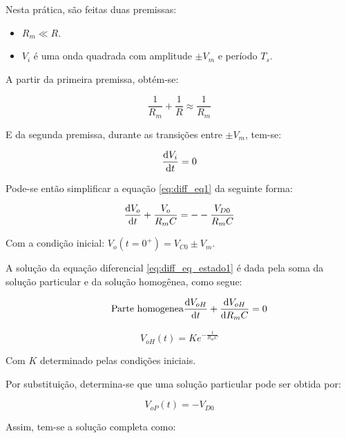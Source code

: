Nesta prática, são feitas duas premissas:

\begin{itemize}
    \item $R_m \ll R$. \\
    \item  $V_i$ é uma onda quadrada com amplitude $\pm V_m$ e período $T_s$.
\end{itemize}

A partir da primeira premissa, obtém-se:

\begin{equation}
    \frac{1}{R_m} + \frac{1}{R} \approx \frac{1}{R_m}
\end{equation}

E da segunda premissa, durante as transições entre $\pm V_m$, tem-se:

\begin{equation}
    \frac{\mathrm d V_i}{\mathrm d t} = 0
\end{equation}

Pode-se então simplificar a equação \ref{eq:diff_eq1} da seguinte forma:

\begin{equation}
    \label{eq:diff_eq_estado1}
    \frac{\mathrm d V_o}{\mathrm d t} + \frac{V_o}{R_m C}= - -\frac{V_{D0}}{R_m C}
\end{equation}

Com a condição inicial: $V_o(t = 0^{+}) = V_{C0} \pm V_m$.

\hfill

A solução da equação diferencial \ref{eq:diff_eq_estado1} é dada pela soma da solução particular e da solução homogênea, como segue:

\begin{equation}
    \tag*{Parte homogenea}
    \frac{\mathrm d V_{oH}}{\mathrm d t} + \frac{\mathrm d V_{oH}}{\mathrm d R_m C} = 0
\end{equation}

\begin{equation}
    \tag*{Solucao generica}
    V_{oH}(t) = K e^{-\frac{t}{R_m C}}
\end{equation}

Com $K$ determinado pelas condições iniciais.

Por substituição, determina-se que uma solução particular pode ser obtida por:

\begin{equation}
    V_{oP}(t) = - V_{D0}
\end{equation}

Assim, tem-se a solução completa como:

